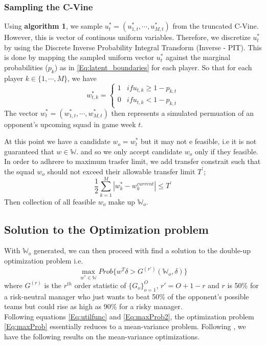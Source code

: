 \documentclass[12pt,oneside,a4paper]{book}
\theoremstyle{definition}
\theoremstyle{remark}
\begin{document}
				\subsubsection{Sampling the C-Vine}
				Using \textbf{algorithm 1}, we sample $u_t^* = (u_{1,t}^*, \cdots, u_{M,t}^*)$ from the truncated C-Vine. However, this is vector of continous uniform variables. Therefore, we discretize $u_t^*$ by using the Discrete Inverse Probability Integral Transform (Inverse - PIT).
				This is done by mapping the sampled uniform vector $u_t^*$ against the marginal probabilities ($p_k$) as in \ref{Eq:latent_boundaries} for each player. So that for each player $k \in \{1, \cdots, M\}$, we have
				\begin{equation}
					w^*_{t,k} =
					\begin{cases}
						1 & if u_{t,k} \geqslant 1 - p_{k,t}\\
						0 & if u_{t,k} < 1 - p_{k,t}
					\end{cases}
				\end{equation}
				The vector $w^*_{t} = \left(w^*_{1,t}, \cdots, w^*_{M,t} \right)$ then represents a simulated permuation of an opponent's upcoming squad in game week $t$.

				At this point we have a candidate $w_o = w^*_t$ but it may not e feasible, i.e it is not guaranteed that $w \in \mathbb{W}$. and so we only accept candidate $w_o$ only if they feasible. In order to adhrere to maximum trasfer limit, we add transfer constrait such that the squad $w_o$ should not exceed their allowable transfer limit $T^{'}$;
				$$
					\frac{1}{2} \sum_{k=1}^{M}\left| w^*_{k}-w^{current}_{k} \right| \leqslant T^{'}
				$$
				Then collection of all feasible $w_o$ make up $\mathbb{W}_o$.

				\subsection{Solution to the Optimization problem}
				With $\mathbb{W}_o$ generated, we can then proceed with find a solution to the double-up optimization problem i.e.\\
				\begin{equation}\label{Eq:maxProb}
					\max_{w^*\in\mathbb{W}}Prob\{w^T\delta > G^{(r')}(\mathbb{W}_o, \delta)\}
				\end{equation}
				where $G^{(r)}$ is the $r^{th}$ order statistic of $\{G_o\}_{o=1}^O$, $r' = O + 1 - r$ and $r$ is 50\% for a risk-neutral manager who just wants to beat 50\% of the opponent’s possible teams but could rise as high as 90\% for a risky manager.\\
				Following equations \ref{Eq:utilfunc} and \ref{Eq:maxProb2}, the optimization problem \ref{Eq:maxProb} essentially reduces to a mean-variance problem. Following \cite{morton2003optimizing}, we have the following results on the mean-variance optimizations.
\end{document}
